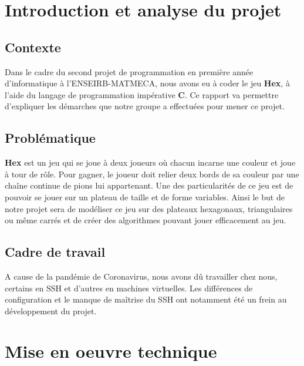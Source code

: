 \documentclass{article}
\begin{document}
\section{Introduction et analyse du projet}
\subsection{Contexte}
Dans le cadre du second projet de programmation en première année d'informatique à l'ENSEIRB-MATMECA, nous avons eu à coder le jeu \textbf{Hex}, à l'aide du langage de programmation impérative \textbf{C}. Ce rapport va permettre d'expliquer les démarches que notre groupe a effectuées pour mener ce projet.

\subsection{Problématique}
\textbf{Hex} est un jeu qui se joue à deux joueurs où chacun incarne une couleur et joue à tour de rôle. Pour gagner, le joueur doit relier deux bords de sa couleur par une chaîne continue de pions lui appartenant. Une des particularités de ce jeu est de pouvoir se jouer sur un plateau de taille et de forme variables. Ainsi le but de notre projet sera de modéliser ce jeu sur des plateaux hexagonaux, triangulaires ou même carrés et de créer des algorithmes pouvant jouer efficacement au jeu.

\subsection{Cadre de travail}
A cause de la pandémie de Coronavirus, nous avons dû travailler chez nous, certains en SSH et d'autres en machines virtuelles. Les différences de configuration et le manque de maîtrise du SSH ont notamment été un frein au développement du projet. 


\section{Mise en oeuvre technique}
\end{document}
